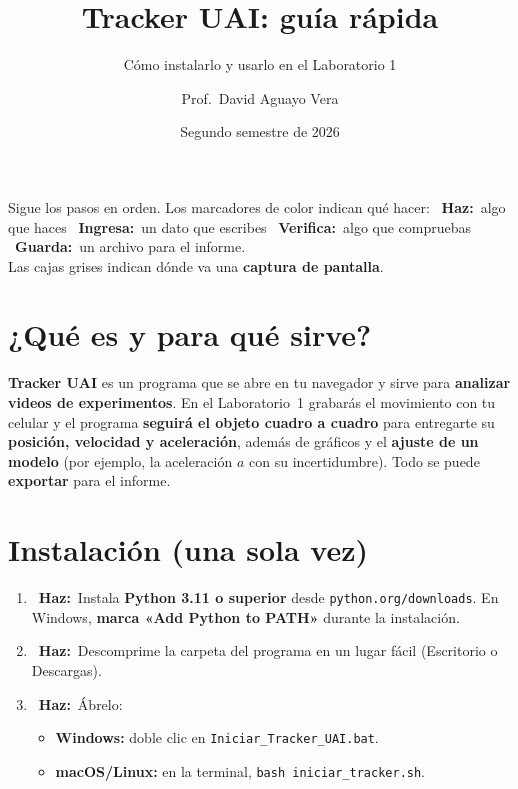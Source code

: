 \documentclass[11pt,a4paper]{article}
\title{Tracker UAI: guía rápida}
\subtitle{Cómo instalarlo y usarlo en el Laboratorio 1}
\author{Prof.\ David Aguayo Vera}
\date{Segundo semestre de 2026}
\newcommand{\Accion}{\textcolor{uaiAzul}{\faHandPointRight\ \textbf{Haz:}}\ }
\newcommand{\Ingresa}{\textcolor{uaiNaranja}{\faKeyboard\ \textbf{Ingresa:}}\ }
\newcommand{\Verifica}{\textcolor{uaiVerde}{\faCheckCircle\ \textbf{Verifica:}}\ }
\newcommand{\Guarda}{\textcolor{uaiVioleta}{\faSave\ \textbf{Guarda:}}\ }
\begin{document}
\maketitle

\begin{obs}
  Sigue los pasos en orden. Los marcadores de color indican qué hacer:
  \Accion algo que haces \quad \Ingresa un dato que escribes \quad
  \Verifica algo que compruebas \quad \Guarda un archivo para el informe.
  \\Las cajas grises indican dónde va una \textbf{captura de pantalla}.
\end{obs}

\section{¿Qué es y para qué sirve?}

\textbf{Tracker UAI} es un programa que se abre en tu navegador y sirve para
\textbf{analizar videos de experimentos}. En el Laboratorio~1 grabarás el
movimiento con tu celular y el programa \textbf{seguirá el objeto cuadro a
cuadro} para entregarte su \textbf{posición, velocidad y aceleración}, además de
gráficos y el \textbf{ajuste de un modelo} (por ejemplo, la aceleración $a$ con
su incertidumbre). Todo se puede \textbf{exportar} para el informe.

\section{Instalación (una sola vez)}

\begin{enumerate}
  \item \Accion Instala \textbf{Python 3.11 o superior} desde
    \texttt{python.org/downloads}. En Windows, \textbf{marca «Add Python to
    PATH»} durante la instalación.
  \item \Accion Descomprime la carpeta del programa en un lugar fácil (Escritorio
    o Descargas).
  \item \Accion Ábrelo:
    \begin{itemize}
      \item \textbf{Windows:} doble clic en \texttt{Iniciar\_Tracker\_UAI.bat}.
      \item \textbf{macOS/Linux:} en la terminal, \texttt{bash iniciar\_tracker.sh}.
    \end{itemize}
\end{enumerate}
\end{document}
